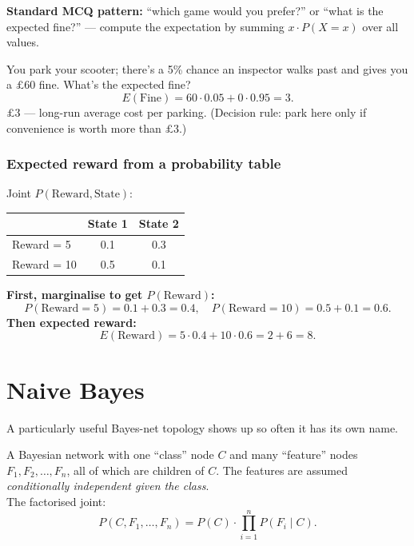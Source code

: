 \documentclass[11pt, a4paper]{article}
\begin{document}
\textbf{Standard MCQ pattern:} ``which game would you prefer?'' or ``what is the expected fine?'' — compute the expectation by summing $x \cdot P(X = x)$ over all values.

\begin{exbox}
You park your scooter; there's a 5\% chance an inspector walks past and gives you a $\pounds 60$ fine. What's the expected fine?
\[
E(\text{Fine}) = 60 \cdot 0.05 + 0 \cdot 0.95 = 3.
\]
$\pounds 3$ — long-run average cost per parking. (Decision rule: park here only if convenience is worth more than $\pounds 3$.)
\end{exbox}

\subsubsection*{Expected reward from a probability table}

\begin{exbox}
Joint $P(\text{Reward}, \text{State})$:\\
\begin{center}
\begin{tabular}{@{}lcc@{}}
\toprule
 & State 1 & State 2 \\
\midrule
Reward = 5  & 0.1 & 0.3 \\
Reward = 10 & 0.5 & 0.1 \\
\bottomrule
\end{tabular}
\end{center}
\textbf{First, marginalise to get $P(\text{Reward})$:}
\[
P(\text{Reward} = 5) = 0.1 + 0.3 = 0.4, \quad P(\text{Reward} = 10) = 0.5 + 0.1 = 0.6.
\]
\textbf{Then expected reward:}
\[
E(\text{Reward}) = 5 \cdot 0.4 + 10 \cdot 0.6 = 2 + 6 = 8.
\]
\end{exbox}

\section{Naive Bayes}

A particularly useful Bayes-net topology shows up so often it has its own name.

\begin{defbox}
A Bayesian network with one ``class'' node $C$ and many ``feature'' nodes $F_1, F_2, \dots, F_n$, all of which are children of $C$. The features are assumed \emph{conditionally independent given the class}.\\[0.3em]
The factorised joint:
\[
P(C, F_1, \dots, F_n) = P(C) \cdot \prod_{i=1}^n P(F_i \mid C).
\]
\end{defbox}
\end{document}
